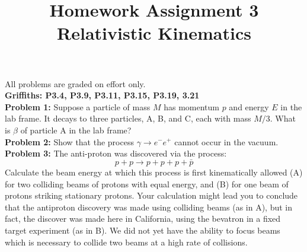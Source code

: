 \documentclass[12pt]{article}
\begin{document}
\newcommand{\ihbar}{\ensuremath{i \hbar}}
\newcommand{\dPsidt}{\ensuremath{ \frac{\partial \Psi}{\partial t} }}
\newcommand{\dPsidx}{\ensuremath{ \frac{\partial \Psi}{\partial x} }}
\newcommand{\ddPsidx}{\ensuremath{ \frac{\partial^2 \Psi}{\partial x^2} }}
\newcommand{\dPssdt}{\ensuremath{ \frac{\partial \Psi^*}{\partial t} }}
\newcommand{\dPssdx}{\ensuremath{ \frac{\partial \Psi^*}{\partial x} }}
\newcommand{\ddPssdx}{\ensuremath{ \frac{\partial^2 \Psi^*}{\partial x^2} }}

\newcommand{\dphidt}{\ensuremath{ \frac{d \phi}{dt} }}
\newcommand{\dpsidx}{\ensuremath{ \frac{d \psi}{dx} }}
\newcommand{\ddpsidx}{\ensuremath{ \frac{d^2 \psi}{dx^2} }}


\date{\vspace{-5ex}}

\title{Homework Assignment 3 \\ Relativistic Kinematics}

\maketitle

\noindent
All problems are graded on effort only.\\

\noindent
{\bf Griffiths: P3.4, P3.9, P3.11, P3.15, P3.19, 3.21}\\[3pt]


\noindent
{\bf Problem 1:} Suppose a particle of mass $M$ has momentum $p$ and
energy $E$ in the lab frame.  It decays to three particles, A, B, and
C, each with mass $M/3$.  What is $\beta$ of particle A in the lab
frame?\\[3pt]

\noindent
{\bf Problem 2:}
Show that the process $\gamma \to e^- e^+$ cannot occur in the vacuum.\\[3pt]

\noindent
{\bf Problem 3:}
The anti-proton was discovered via the process:
$$p + p \to p + p + p + \bar{p}$$ Calculate the beam energy at which
this process is first kinematically allowed (A) for two colliding
beams of protons with equal energy, and (B) for one beam of protons
striking stationary protons.  Your calculation might lead you to
conclude that the antiproton discovery was made using colliding beams
(as in A), but in fact, the discover was made here in California,
using the bevatron in a fixed target experiment (as in B).  We did not
yet have the ability to focus beams which is necessary to collide two
beams at a high rate of collisions.\\[3pt]
\end{document}
